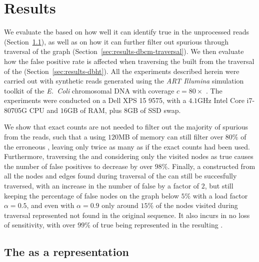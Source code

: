 \chapter{Results}

We evaluate the \dBCM based on how well it can identify true  in the unprocessed reads (Section~\ref{sec:results-dbcm-counting}), as well as on how it can further filter out spurious  through traversal of the graph (Section~\ref{sec:results-dbcm-traversal}). We then evaluate how the false positive rate is affected when traversing the \dBHT built from the traversal of the \dBCM (Section~\ref{sec:results-dbht}). All the experiments described herein were carried out with synthetic reads generated using the \emph{ART Illumina} simulation toolkit \cite{Huang2011} of the \emph{E.~Coli} chromosomal DNA \cite{ecoligenome} with coverage $c = 80\times$ . The experiments were conducted on a Dell XPS 15 9575, with a $4.1$GHz Intel Core i7-80705G CPU and $16$GB of RAM, plus $8$GB of SSD swap.

We show that exact counts are not needed to filter out the majority of spurious  from the reads, such that a \dBCM using $120$MB of memory can still filter over $80\%$ of the erroneous , leaving only twice as many as if the exact counts had been used. Furthermore, traversing the \dBCM and considering only the visited nodes as true  causes the number of false positives to decrease by over $98\%$. Finally, a \dBHT constructed from all the nodes and edges found during traversal of the \dBCM can still be succesfully traversed, with an increase in the number of false  by a factor of $2$, but still keeping the percentage of false nodes on the graph below $5\%$ with a load factor $\alpha = 0.5$, and even with $\alpha = 0.9$ only around $15\%$ of the nodes visited during traversal represented  not found in the original sequence. It also incurs in no loss of sensitivity, with over $99\%$ of true  being represented in the resulting \dBG. 

\section{The \dBCM as a \dBG representation}
\label{sec:results-dbcm-counting}

